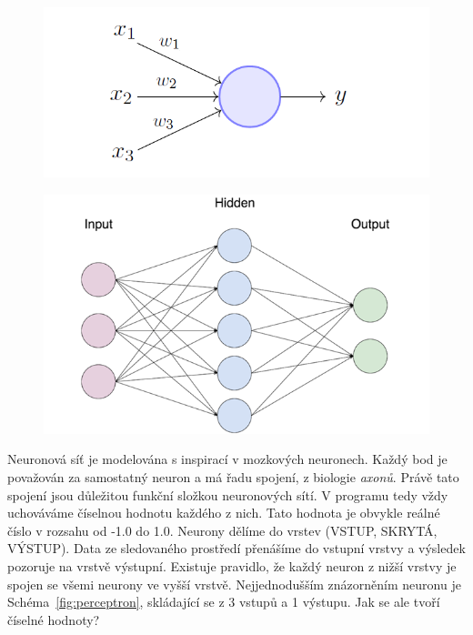 \documentclass[a4paper,12pt]{article}
\begin{document}
        \begin{figure}[H]
        \centering
        \begin{minipage}[t]{.5\textwidth}
            \centering
            \includegraphics[width=0.9\linewidth]{data/perceptron-model1.png}
            \label{fig:perceptron}
        \end{minipage}%
        \begin{minipage}[t]{.5\textwidth}
            \centering
            \includegraphics[width=0.85\linewidth]{data/easynn-scheme.png}
            \label{fig:easynn}
        \end{minipage}
        \end{figure}

        Neuronová síť je modelována s inspirací v mozkových neuronech. Každý bod je považován za
        samostatný neuron a má řadu spojení, z biologie \textit{axonů}. Právě tato spojení jsou důležitou
        funkční složkou neuronových sítí. V programu tedy vždy uchováváme číselnou hodnotu každého z nich.
        Tato hodnota je obvykle reálné číslo v rozsahu od -1.0 do 1.0.
        Neurony dělíme do vrstev (VSTUP, SKRYTÁ, VÝSTUP). Data ze sledovaného prostředí přenášíme
        do vstupní vrstvy a výsledek pozoruje na vrstvě výstupní. Existuje pravidlo, že každý neuron z nižší vrstvy 
        je spojen se všemi neurony ve vyšší vrstvě. Nejjednodušším znázorněním neuronu je 
        Schéma~\ref{fig:perceptron}, skládající se z 3 vstupů a 1 výstupu.
        Jak se ale tvoří číselné hodnoty?
\end{document}
